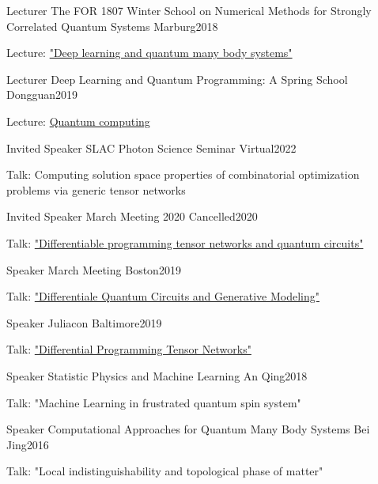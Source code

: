 \documentclass[11pt, a4paper]{awesome-cv}
\begin{document}
%
\begin{cventries}
\cventry
    {Lecturer}
    {The FOR 1807 Winter School on Numerical Methods for Strongly Correlated Quantum Systems}
    {Marburg}{2018}
    {
    \begin{cvitems}
        Lecture: \href{https://github.com/GiggleLiu/marburg}{"Deep learning and quantum many body systems"}
    \end{cvitems}
    }
\cventry
    {Lecturer}
    {Deep Learning and Quantum Programming: A Spring School}
    {Dongguan}{2019}
    {
    \begin{cvitems}
        Lecture: \href{https://github.com/QuantumBFS/SSSS}{Quantum computing}
    \end{cvitems}
    }
\cventry
    {Invited Speaker}
    {SLAC Photon Science Seminar}
    {Virtual}{2022}
    {
    \begin{cvitems}
        Talk: Computing solution space properties of combinatorial optimization problems via generic tensor networks
    \end{cvitems}
    }
\cventry
    {Invited Speaker}
    {March Meeting 2020}
    {Cancelled}{2020}
    {
    \begin{cvitems}
        Talk: \href{https://meetings.aps.org/Meeting/MAR20/Session/W39.1}{"Differentiable programming tensor networks and quantum circuits"}
    \end{cvitems}
    }
\cventry
    {Speaker} %
    {March Meeting} %
    {Boston}{2019} %
    {
    \begin{cvitems}
        Talk: \href{https://meetings.aps.org/Meeting/MAR19/Session/E27.10}{"Differentiale Quantum Circuits and Generative Modeling"}
    \end{cvitems}
    }
\cventry
    {Speaker}
    {Juliacon}
    {Baltimore}{2019}
    {
    \begin{cvitems}
        Talk: \href{https://www.youtube.com/watch?v=f-CaQMTqjPk}{"Differential Programming Tensor Networks"}
    \end{cvitems}
    }
\cventry
    {Speaker}
    {Statistic Physics and Machine Learning}
    {An Qing}{2018}
    {
    \begin{cvitems}
        Talk: "Machine Learning in frustrated quantum spin system"
    \end{cvitems}
    }
\cventry
    {Speaker}
    {Computational Approaches for Quantum Many Body Systems}
    {Bei Jing}{2016}
    {
    \begin{cvitems}
        Talk: "Local indistinguishability and topological phase of matter"

\end{cvitems}}
\end{cventries}
\end{document}
